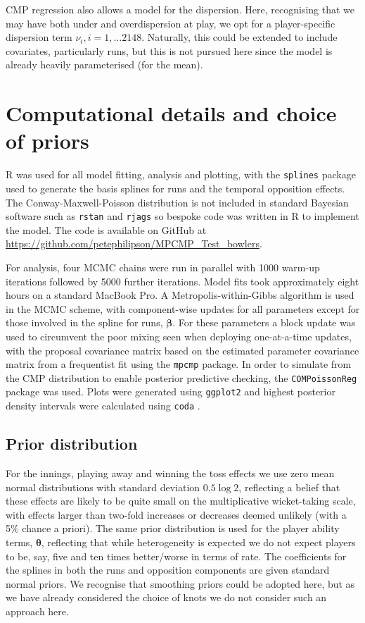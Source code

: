 \documentclass{statsoc}
\renewcommand{\vec}[1]{\boldsymbol{#1}}
\newcommand{\thetavec}{\vec{\theta}}
\newcommand{\numtestbowlers}{2148}
\begin{document}
CMP regression also allows a model for the dispersion. Here, recognising that we may have both under and overdispersion at play, we opt for a player-specific dispersion term $\nu_i, i = 1, \ldots \numtestbowlers$.  Naturally, this could be extended to include covariates, particularly runs, but this is not pursued here since the model is already heavily parameterised (for the mean).

\section{Computational details and choice of priors}
R \citep{rcore} was used for all model fitting, analysis and plotting, with the \verb|splines| package used to generate the basis splines for runs and the temporal opposition effects. The Conway-Maxwell-Poisson distribution is not included in standard Bayesian software such as \verb|rstan| \citep{rstan} and \verb|rjags| \citep{Plummer2004} so bespoke code was written in R to implement the model. The code is available on GitHub at \url{https://github.com/petephilipson/MPCMP_Test_bowlers}.
 
For analysis, four MCMC chains were run in parallel with 1000 warm-up iterations followed by 5000 further iterations. Model fits took approximately eight hours on a standard MacBook Pro. A Metropolis-within-Gibbs algorithm is used in the MCMC scheme, with component-wise updates for all parameters except for those involved in the spline for runs, $\vec{\beta}$. For these parameters a block update was used to circumvent the poor mixing seen when deploying one-at-a-time updates, with the proposal covariance matrix based on the estimated parameter covariance matrix from a frequentist fit using the \verb|mpcmp| package. In order to simulate from the CMP distribution to enable posterior predictive checking, the \verb|COMPoissonReg| \citep{COMPoissonReg} package was used. Plots were generated using \verb|ggplot2| \citep{ggplot2} and highest posterior density intervals were calculated using \verb|coda| \citep{Rcoda}.

\subsection{Prior distribution}
For the innings, playing away and winning the toss effects we use zero mean normal distributions with standard deviation $0.5 \log 2$, reflecting a belief that these effects are likely to be quite small on the multiplicative wicket-taking scale, with effects larger than two-fold increases or decreases deemed unlikely (with a 5\% chance a priori). The same prior distribution is used for the player ability terms, $\thetavec$, reflecting that while heterogeneity is expected we do not expect players to be, say, five and ten times better/worse in terms of rate. The coefficients for the splines in both the runs and opposition components are given standard normal priors. We recognise that smoothing priors could be adopted here, but as we have already considered the choice of knots we do not consider such an approach here.
\end{document}
